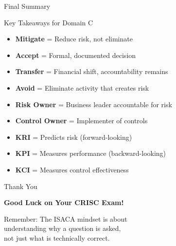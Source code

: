 \documentclass{beamer}
\begin{document}
	\begin{frame}{Final Summary}
		\begin{block}{Key Takeaways for Domain C}
			\begin{itemize}
				\item \textbf{Mitigate} = Reduce risk, not eliminate
				\item \textbf{Accept} = Formal, documented decision
				\item \textbf{Transfer} = Financial shift, accountability remains
				\item \textbf{Avoid} = Eliminate activity that creates risk
				\item \textbf{Risk Owner} = Business leader accountable for risk
				\item \textbf{Control Owner} = Implementer of controls
				\item \textbf{KRI} = Predicts risk (forward-looking)
				\item \textbf{KPI} = Measures performance (backward-looking)
				\item \textbf{KCI} = Measures control effectiveness
			\end{itemize}
		\end{block}
	\end{frame}
	
	\begin{frame}{Thank You}
		\begin{center}
			\Huge
			\textbf{Good Luck on Your CRISC Exam!}
			
			\vspace{1cm}
			
			\normalsize
			Remember: The ISACA mindset is about\\
			understanding why a question is asked,\\
			not just what is technically correct.
		\end{center}
	\end{frame}
	
\end{document}
